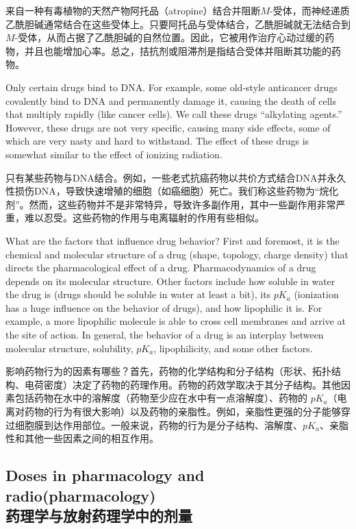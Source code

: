 \documentclass[dvipsnames, svgnames,a4paper,11pt]{article}
\begin{document}
来自一种有毒植物的天然产物阿托品（atropine）结合并阻断$M$-受体，而神经递质乙酰胆碱通常结合在这些受体上。只要阿托品与受体结合，乙酰胆碱就无法结合到$M$-受体，从而占据了乙酰胆碱的自然位置。因此，它被用作治疗心动过缓的药物，并且也能增加心率。总之，拮抗剂或阻滞剂是指结合受体并阻断其功能的药物。

Only certain drugs bind to DNA. For example, some old-style anticancer drugs covalently bind to DNA and permanently damage it, causing the death of cells that multiply rapidly (like cancer cells). We call these drugs “alkylating agents.” However, these drugs are not very specific, causing many side effects, some of which are very nasty and hard to withstand. The effect of these drugs is somewhat similar to the effect of ionizing radiation.

只有某些药物与DNA结合。例如，一些老式抗癌药物以共价方式结合DNA并永久性损伤DNA，导致快速增殖的细胞（如癌细胞）死亡。我们称这些药物为“烷化剂”。然而，这些药物并不是非常特异，导致许多副作用，其中一些副作用非常严重，难以忍受。这些药物的作用与电离辐射的作用有些相似。

What are the factors that influence drug behavior? First and foremost, it is the chemical and molecular structure of a drug (shape, topology, charge density) that directs the pharmacological effect of a drug. Pharmacodynamics of a drug depends on its molecular structure. Other factors include how soluble in water the drug is (drugs should be soluble in water at least a bit), its $pK_a$ (ionization has a huge influence on the behavior of drugs), and how lipophilic it is. For example, a more lipophilic molecule is able to cross cell membranes and arrive at the site of action. In general, the behavior of a drug is an interplay between molecular structure, solubility, $pK_a$, lipophilicity, and some other factors.

影响药物行为的因素有哪些？首先，药物的化学结构和分子结构（形状、拓扑结构、电荷密度）决定了药物的药理作用。药物的药效学取决于其分子结构。其他因素包括药物在水中的溶解度（药物至少应在水中有一点溶解度）、药物的 $pK_a$（电离对药物的行为有很大影响）以及药物的亲脂性。例如，亲脂性更强的分子能够穿过细胞膜到达作用部位。一般来说，药物的行为是分子结构、溶解度、$pK_a$、亲脂性和其他一些因素之间的相互作用。

\subsection{Doses in pharmacology and radio(pharmacology)\\药理学与放射药理学中的剂量}
\end{document}
